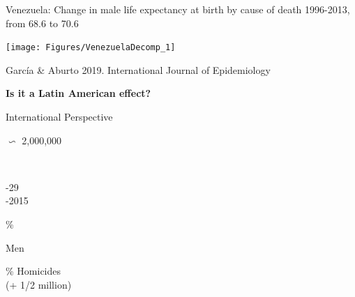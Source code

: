 \documentclass[xcolor={dvipsnames}]{beamer}
\begin{document}
\begin{frame}
	\begin{center}
		\Large{Venezuela: Change in male life expectancy at birth by cause of death 1996-2013, from 68.6 to 70.6}
	\end{center}

	\begin{center}
		\texttt{[image: Figures/VenezuelaDecomp\_1]}
	\end{center}

	\tiny{Garc\'ia \& Aburto 2019. International Journal of Epidemiology}	
	
\end{frame}

\begin{frame}
	\Huge{
	\begin{center}
		\bf{Is it a Latin American effect?}
	\end{center}
	}
\end{frame}


\begin{frame}
\Huge{
\begin{center}
International Perspective \linebreak \\

{\fontsize{70}{80}\selectfont 

 $\backsim$ 2,000,000}\\ \pause
 
-29\\

\bigskip {}-2015

\end{center}
}
\end{frame}

\begin{frame}
\Huge{
\begin{center}
{\fontsize{70}{80}\% \\
}
\bigskip

{\fontsize{50}{60}\selectfont

Men
}

\end{center}
}
\end{frame}


\begin{frame}
\Huge{
\begin{center}
{\fontsize{70}{80}\% Homicides}\\
(+ 1/2 million)

\end{center}
}
\end{frame}
%
%
%
%
\end{document}
